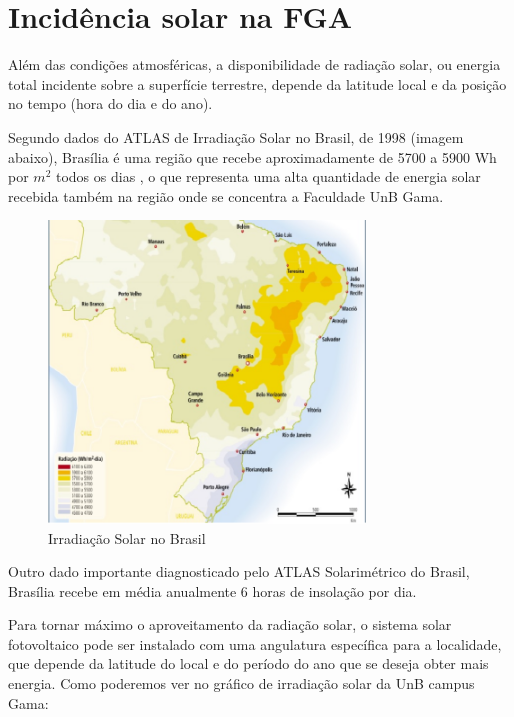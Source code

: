 \section{Incidência solar na FGA}
Além das condições atmosféricas, a disponibilidade de radiação solar, ou energia total incidente sobre a superfície terrestre, depende da latitude local e da posição no tempo (hora do dia e do ano). 

\par Segundo dados do ATLAS de Irradiação Solar no Brasil, de 1998 (imagem abaixo), Brasília é uma região que recebe aproximadamente de 5700 a 5900 Wh por $m^2$ todos os dias , o que representa uma alta quantidade de energia solar recebida também na região onde se concentra a Faculdade UnB Gama.

\begin{figure}[h]
\centering
\includegraphics[width=0.75\textwidth]{figuras/atlas.png}
\caption{Irradiação Solar no Brasil}
\end{figure}

Outro dado importante diagnosticado pelo ATLAS Solarimétrico do Brasil, Brasília recebe em média anualmente 6 horas de insolação por dia. 

Para tornar máximo o aproveitamento da radiação solar, o sistema solar fotovoltaico pode ser instalado com uma angulatura específica para a localidade, que depende da latitude do local e do período do ano que se deseja obter mais energia. Como poderemos ver no gráfico de irradiação solar da UnB campus Gama:

